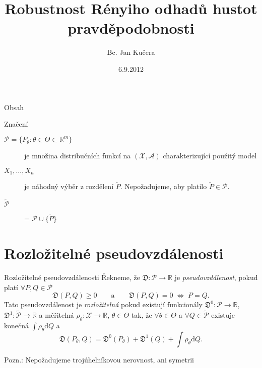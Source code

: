 \documentclass[11pt,a4paper]{beamer}
\author{Bc. Jan Kučera}
\title{Robustnost Rényiho odhadů hustot pravděpodobnosti}
\institute{FJFI, ČVUT\\ $\quad$  \\ Vedoucí práce: Ing. Václav Kůs Ph.D.}
\date{6.9.2012}
\begin{document}
\begin{frame}
	\maketitle
\end{frame}

\begin{frame}{Obsah}
    	\tableofcontents
\end{frame}

%
\begin{frame}{Značení}
\begin{description}
	\item[$\mathcal{P} = \lbrace P_\theta : \theta \in \Theta \subset \mathbb{R}^m \rbrace$] je množina distribučních funkcí na  $\left(\mathcal{X},\mathcal{A}\right)$ charakterizující použitý model
	\item[$X_1,\ldots,X_n$] je náhodný výběr z rozdělení $\tilde{P}$. Nepožadujeme, aby platilo $\tilde{P} \in \mathcal{P}$.
	\item[$\mathcal{\tilde{P}}$] = $\mathcal{P} \cup \lbrace \tilde{P} \rbrace$
\end{description}
\end{frame}

\section{Rozložitelné pseudovzdálenosti} %
\begin{frame}{Rozložitelné pseudovzdálenosti}
		Řekneme, že $\mathfrak{D}:\mathcal{P} \rightarrow \mathbb{R}$ je \emph{pseudovzdálenost}, pokud platí $\forall P,Q\in\mathcal{P}$
		\begin{equation*}
			\mathfrak{D}(P,Q) \geq 0  \qquad \text{a} \qquad \mathfrak{D}(P,Q)=0 \; \Leftrightarrow \; P=Q.
		\end{equation*}
		 Tato  pseudovzdálenost je  \emph{rozložitelná} pokud existují funkcionály
		 $\mathfrak{D}^0:\mathcal{P}\rightarrow\mathbb{R}$, $ \mathfrak{D}^1:\mathcal{\tilde{P}} \rightarrow \mathbb{R}$ a měřitelná
		  $\rho_\theta : \mathcal{X} \rightarrow \mathbb{R}$, $ \theta \in \Theta$ tak, že $\forall \theta \in \Theta$ a $\forall Q \in \mathcal{\tilde{P}}$ existuje konečná $\int{\rho_\theta }\mathrm{d}Q$ a
		\begin{equation*}
			\mathfrak{D} (P_\theta, Q) = \mathfrak{D}^0 (P_\theta) + \mathfrak{D}^1 (Q) + \int \rho_\theta \mathrm{d}Q.
		\end{equation*}

			Pozn.: Nepožadujeme trojúhelníkovou nerovnost, ani symetrii
		
\end{frame}
\end{document}
